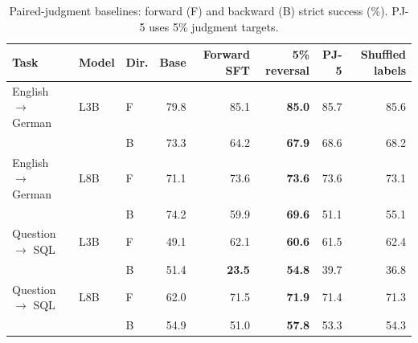 \begin{table}[t]\centering\footnotesize
\setlength{\tabcolsep}{3pt}
\begin{tabular}{lllrrrrr}
\toprule
Task & Model & Dir. & Base & Forward SFT & 5\% reversal & PJ-5 & Shuffled labels \\
\midrule
English $\to$ German & L3B & F & 79.8 & 85.1 & \textcolor{blue!60!black}{\textbf{85.0}} & 85.7 & 85.6 \\
 &  & B & 73.3 & 64.2 & \textcolor{blue!60!black}{\textbf{67.9}} & 68.6 & 68.2 \\
\addlinespace[2pt]
English $\to$ German & L8B & F & 71.1 & 73.6 & \textcolor{blue!60!black}{\textbf{73.6}} & 73.6 & 73.1 \\
 &  & B & 74.2 & 59.9 & \textcolor{blue!60!black}{\textbf{69.6}} & 51.1 & 55.1 \\
\addlinespace[2pt]
Question $\to$ SQL & L3B & F & 49.1 & 62.1 & \textcolor{blue!60!black}{\textbf{60.6}} & 61.5 & 62.4 \\
 &  & B & 51.4 & \textcolor{red!70!black}{\textbf{23.5}} & \textcolor{blue!60!black}{\textbf{54.8}} & 39.7 & 36.8 \\
\addlinespace[2pt]
Question $\to$ SQL & L8B & F & 62.0 & 71.5 & \textcolor{blue!60!black}{\textbf{71.9}} & 71.4 & 71.3 \\
 &  & B & 54.9 & 51.0 & \textcolor{blue!60!black}{\textbf{57.8}} & 53.3 & 54.3 \\
\bottomrule
\end{tabular}
\caption{Paired-judgment baselines: forward (F) and backward (B) strict success (\%). PJ-5 uses 5\% judgment targets.}\label{tab:paired-judgment}
\end{table}
